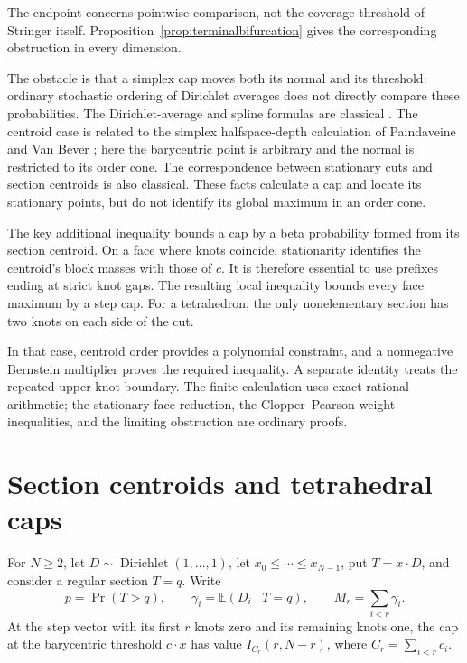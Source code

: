 \documentclass[11pt]{article}
\theoremstyle{definition}
\newcommand{\E}{\mathbb{E}}
\begin{document}
The endpoint concerns pointwise comparison, not the coverage threshold of
Stringer itself. Proposition~\ref{prop:terminalbifurcation} gives the
corresponding obstruction in every dimension.

The obstacle is that a simplex cap moves both its normal and its threshold:
ordinary stochastic ordering of Dirichlet averages does not directly
compare these probabilities. The Dirichlet-average and spline formulas
are classical \cite{carlson1991,lasserre2015}. The centroid case is related
to the simplex halfspace-depth calculation of Paindaveine and Van Bever
\cite{paindaveine2017}; here the barycentric point is arbitrary and the
normal is restricted to its order cone. The correspondence
between stationary cuts and section centroids
\cite[Proposition~1.11]{patakova2022} is also classical. These facts calculate a cap and locate
its stationary points, but do not identify its global maximum in an order
cone.

The key additional inequality bounds a cap by a beta probability formed
from its section centroid. On a face where knots coincide, stationarity
identifies the centroid's block masses with those of $c$. It is therefore
essential to use prefixes ending at strict knot gaps. The resulting local
inequality bounds every face maximum by a step cap. For a tetrahedron,
the only nonelementary section has two knots on each side of the cut.

In that case, centroid order provides a polynomial constraint, and a
nonnegative Bernstein multiplier proves the required inequality. A separate
identity treats the repeated-upper-knot boundary. The finite calculation
uses exact rational arithmetic; the stationary-face reduction, the
Clopper--Pearson weight inequalities, and the limiting obstruction are
ordinary proofs.

\section{Section centroids and tetrahedral caps}\label{sec:fourcap}

For $N\ge2$, let $D\sim\operatorname{Dirichlet}(1,\ldots,1)$, let
$x_0\le\cdots\le x_{N-1}$, put $T=x\mathbin{\cdot}D$, and consider a
regular section $T=q$.  Write
\begin{equation}\label{eq:sectioncentroid}
 p=\Pr(T>q),\qquad
 \gamma_i=\E(D_i\mid T=q),\qquad
 M_r=\sum_{i<r}\gamma_i.
\end{equation}
At the step vector with its first $r$ knots zero and its remaining knots one,
the cap at the barycentric threshold $c\mathbin{\cdot}x$ has value
$I_{C_r}(r,N-r)$, where $C_r=\sum_{i<r}c_i$.
\end{document}

